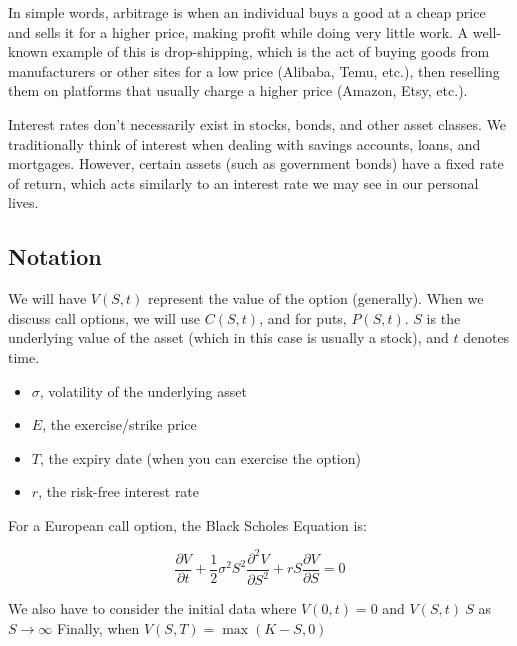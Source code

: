 \documentclass{article}
\begin{document}
In simple words, arbitrage is when an individual buys a good at a cheap price and sells it for a higher price, making profit while doing very little work. A well-known example of this is drop-shipping, 
which is the act of buying goods from manufacturers or other sites for a low price (Alibaba, Temu, etc.), then reselling them on platforms that usually charge a higher price (Amazon, Etsy, etc.).

Interest rates don't necessarily exist in stocks, bonds, and other asset classes. We traditionally think of interest when dealing with savings accounts, loans, and mortgages. However, certain 
assets (such as government bonds) have a fixed rate of return, which acts similarly to an interest rate we may see in our personal lives.

\subsection*{Notation}



We will have $V(S,t)$ represent the value of the option (generally). When we discuss call options, we will use $C(S,t)$, and for puts, $P(S,t)$.
$S$ is the underlying value of the asset (which in this case is usually a stock), and $t$ denotes time.
\begin{itemize}
    \item $\sigma$, volatility of the underlying asset
    \item $E$, the exercise/strike price
    \item $T$, the expiry date (when you can exercise the option)
    \item $r$, the risk-free interest rate
    \end{itemize}

For a European call option, the Black Scholes Equation is:

\begin{equation}
    \frac{\partial V}{\partial t} + \frac{1}{2}\sigma^2S^2 \frac{\partial^2 V}{\partial S^2} + rS\frac{\partial V}{\partial S} = 0 
\end{equation}


We also have to consider the initial data where $V(0,t) = 0$ and $V(S,t) ~ S$ as $S \to \infty$
Finally, when $V(S,T) = \max{(K-S,0)}$
\end{document}

